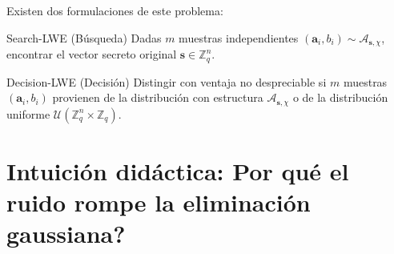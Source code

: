 \documentclass[11pt,a4paper,twoside,openright]{book}
\theoremstyle{plain}
\theoremstyle{definition}
\theoremstyle{remark}
\newcommand{\Zq}{\mathbb{Z}_q}
\newcommand{\vv}[1]{\mathbf{#1}}
\begin{document}
Existen dos formulaciones de este problema:

\begin{midef}{Search-LWE (B\'usqueda)}
Dadas $m$ muestras independientes $(\vv{a}_i, b_i) \sim \mathcal{A}_{\vv{s}, \chi}$, encontrar el vector secreto original $\vv{s} \in \Zq^n$.
\end{midef}

\begin{midef}{Decision-LWE (Decisi\'on)}
Distingir con ventaja no despreciable si $m$ muestras $(\vv{a}_i, b_i)$ provienen de la distribuci\'on con estructura $\mathcal{A}_{\vv{s}, \chi}$ o de la distribuci\'on uniforme $\mathcal{U}(\Zq^n \times \Zq)$.
\end{midef}

\section{Intuici\'on did\'actica: \textquestiondown Por qu\'e el ruido rompe la eliminaci\'on gaussiana?}
\end{document}
